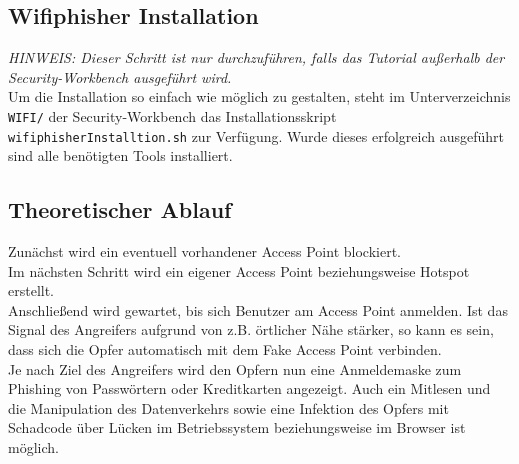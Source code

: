 \subsection{Wifiphisher Installation}
\textit{HINWEIS: Dieser Schritt ist nur durchzuführen, falls das Tutorial außerhalb der Security-Workbench ausgeführt wird.}\\
Um die Installation so einfach wie möglich zu gestalten, steht im Unterverzeichnis \colorbox{altgray}{\lstinline|WIFI/|} der Security-Workbench das Installationsskript \colorbox{altgray}{\lstinline|wifiphisherInstalltion.sh|} zur Verfügung. Wurde dieses erfolgreich ausgeführt sind alle benötigten Tools installiert.

\subsection{Theoretischer Ablauf}

Zunächst wird ein eventuell vorhandener Access Point blockiert. \\
Im nächsten Schritt wird ein eigener Access Point beziehungsweise Hotspot erstellt. \\
Anschließend wird gewartet, bis sich Benutzer am Access Point anmelden. Ist das Signal des Angreifers aufgrund von z.B. örtlicher Nähe stärker, so kann es sein, dass sich die Opfer automatisch mit dem Fake Access Point verbinden. \\
Je nach Ziel des Angreifers wird den Opfern nun eine Anmeldemaske zum Phishing von Passwörtern oder Kreditkarten angezeigt.
Auch ein Mitlesen und die Manipulation des Datenverkehrs sowie eine Infektion des Opfers mit Schadcode über Lücken im Betriebssystem beziehungsweise im Browser ist möglich.

